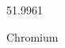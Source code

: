 \documentclass[12pt]{article}
\begin{document}
\hfill{}
\vfill
\begin{center}
  {\fontsize{50}{60}
  }

  51.9961

Chromium
\end{center}
\vfill
\end{document}
